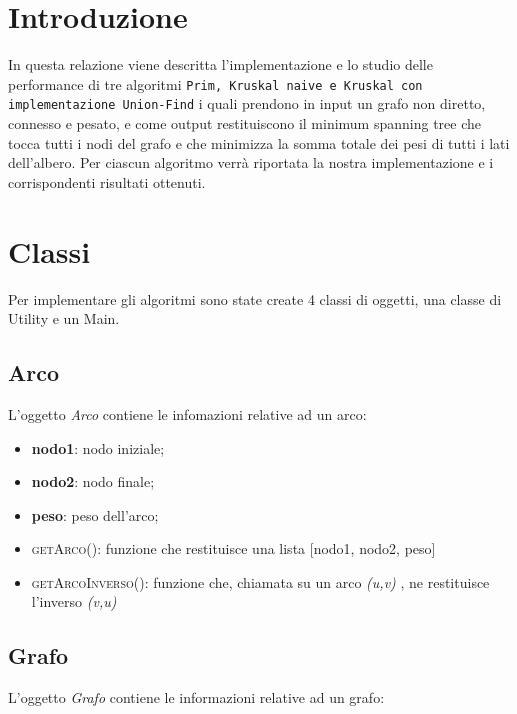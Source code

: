 \section{Introduzione}
\label{Introduzione}

In questa relazione viene descritta l'implementazione e lo studio delle performance di tre algoritmi \texttt{Prim, Kruskal naive e Kruskal con implementazione Union-Find} i quali prendono in input un grafo non diretto, connesso e pesato, e come output restituiscono il minimum spanning tree che tocca tutti i nodi del grafo e che minimizza la somma totale dei pesi di tutti i lati dell'albero.
Per ciascun algoritmo verrà riportata la nostra implementazione e i corrispondenti risultati ottenuti.

\section{Classi}
\label{Classi}

Per implementare gli algoritmi sono state create 4 classi di oggetti, una classe di Utility e un Main.

\subsection{Arco}
\label{Arco}

L'oggetto \textit{Arco} contiene le infomazioni relative ad un arco:

\begin{itemize}
    \item \textbf{nodo1}: nodo iniziale;
    \item \textbf{nodo2}: nodo finale;
    \item \textbf{peso}: peso dell'arco;
    \item \textsc{getArco()}: funzione che restituisce una lista [nodo1, nodo2, peso]
    \item \textsc{getArcoInverso()}: funzione che, chiamata su un arco \emph{(u,v)} , ne restituisce l'inverso \emph{(v,u)}
\end{itemize}

\subsection{Grafo}
\label{Grafo}

L'oggetto \textit{Grafo} contiene le informazioni relative ad un grafo:

